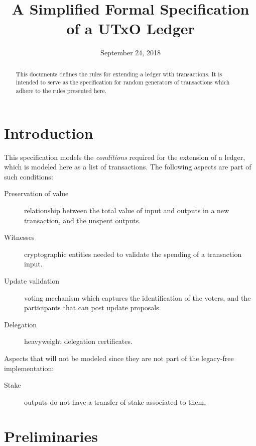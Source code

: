 \documentclass[11pt,a4paper]{article}
\begin{document}
\title{A Simplified Formal Specification of a UTxO Ledger}

\author{}

\date{September 24, 2018}

\maketitle

\begin{abstract}
This documents defines the rules for extending a ledger with transactions. It
is intended to serve as the specification for random generators of transactions
which adhere to the rules presented here.
\end{abstract}

\tableofcontents
\listoffigures

\section{Introduction}
\label{sec:introduction}

This specification models the \textit{conditions} required for the extension of
a ledger, which is modeled here as a list of transactions. The following
aspects are part of such conditions:

\begin{description}
\item[Preservation of value] relationship between the total value of input and outputs
  in a new transaction, and the unspent outputs.
\item[Witnesses] cryptographic entities needed to validate the spending
  of a transaction input.
\item[Update validation] voting mechanism which captures the identification of
  the voters, and the participants that can post update proposals.
\item[Delegation] heavyweight delegation certificates.  
\end{description}

Aspects that will not be modeled since they are not part of the legacy-free
implementation:
\begin{description}
\item[Stake] outputs do not have a transfer of stake associated to them.
\end{description}
\section{Preliminaries}\label{sec:preliminaries}
\end{document}
